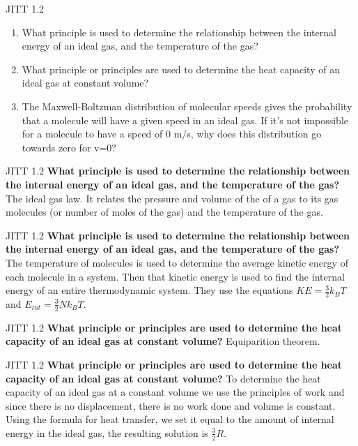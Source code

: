 \documentclass{beamer}
\begin{document}
\begin{frame}{JITT 1.2}
\begin{enumerate}
\item What principle is used to determine the relationship between the internal energy of an ideal gas, and the temperature of the gas?
\item What principle or principles are used to determine the heat capacity of an ideal gas at constant volume?
\item The Maxwell-Boltzman distribution of molecular speeds gives the probability that a molecule will have a given speed in an ideal gas.  If it's not impossible for a molecule to have a speed of 0 m/s, why does this distribution go towards zero for v=0?
\end{enumerate}
\end{frame}

\begin{frame}{JITT 1.2}
\textbf{What principle is used to determine the relationship between the internal energy of an ideal gas, and the temperature of the gas?}
The ideal gas law. It relates the pressure and volume of the of a gas to its gas molecules (or number of moles of the gas) and the temperature of the gas.
\end{frame}

\begin{frame}{JITT 1.2}
\textbf{What principle is used to determine the relationship between the internal energy of an ideal gas, and the temperature of the gas?}
The temperature of molecules is used to determine the average kinetic energy of each molecule in a system. Then that kinetic energy is used to find the internal energy of an entire thermodynamic system. They use the equations $KE = \frac{3}{2}k_B T$ and $E_{int}=\frac{3}{2}Nk_BT$.
\end{frame}

\begin{frame}{JITT 1.2}
\textbf{What principle or principles are used to determine the heat capacity of an ideal gas at constant volume?}
Equiparition theorem.
\end{frame}

\begin{frame}{JITT 1.2}
\textbf{What principle or principles are used to determine the heat capacity of an ideal gas at constant volume?}
To determine the heat capacity of an ideal gas at a constant volume we use the principles of work and since there is no displacement, there is no work done and volume is constant. Using the formula for heat transfer, we set it equal to the amount of internal energy in the ideal gas, the resulting solution is $\frac{3}{2}R$.
\end{frame}
\end{document}
